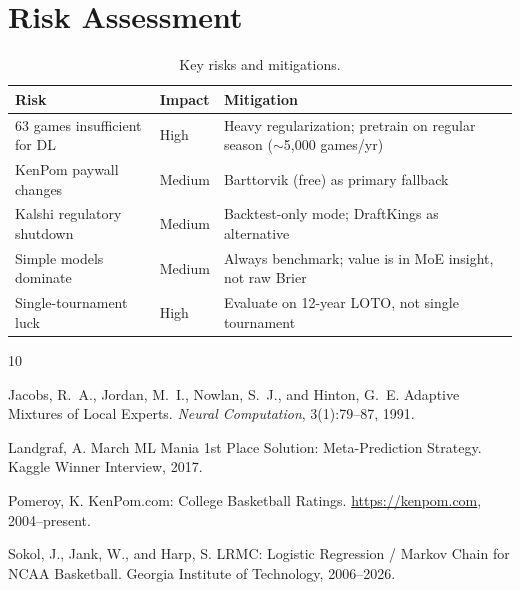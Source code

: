 \documentclass[11pt,a4paper]{article}
\begin{document}
\section{Risk Assessment}

\begin{table}[h]
\centering
\caption{Key risks and mitigations.}
\label{tab:risks}
\begin{tabular}{@{}p{4cm}p{2cm}p{6.5cm}@{}}
\toprule
\textbf{Risk} & \textbf{Impact} & \textbf{Mitigation} \\
\midrule
63 games insufficient for DL & High & Heavy regularization; pretrain on regular season ($\sim$5{,}000 games/yr) \\
KenPom paywall changes & Medium & Barttorvik (free) as primary fallback \\
Kalshi regulatory shutdown & Medium & Backtest-only mode; DraftKings as alternative \\
Simple models dominate & Medium & Always benchmark; value is in MoE insight, not raw Brier \\
Single-tournament luck & High & Evaluate on 12-year LOTO, not single tournament \\
\bottomrule
\end{tabular}
\end{table}



\begin{thebibliography}{10}

Jacobs, R.~A., Jordan, M.~I., Nowlan, S.~J., and Hinton, G.~E.
\newblock Adaptive Mixtures of Local Experts.
\newblock \emph{Neural Computation}, 3(1):79--87, 1991.

Landgraf, A.
\newblock March ML Mania 1st Place Solution: Meta-Prediction Strategy.
\newblock Kaggle Winner Interview, 2017.

Pomeroy, K.
\newblock KenPom.com: College Basketball Ratings.
\newblock \url{https://kenpom.com}, 2004--present.


Sokol, J., Jank, W., and Harp, S.
\newblock LRMC: Logistic Regression / Markov Chain for NCAA Basketball.
\newblock Georgia Institute of Technology, 2006--2026.

\end{thebibliography}
\end{document}

